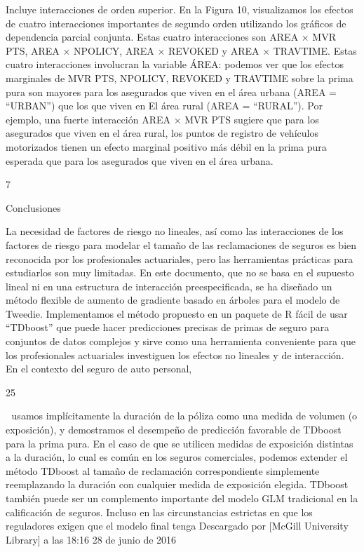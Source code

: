 \documentclass[]{article}
\begin{document}
Incluye interacciones de orden superior. En la Figura 10, visualizamos
los efectos de cuatro interacciones importantes de segundo orden
utilizando los gráficos de dependencia parcial conjunta. Estas cuatro
interacciones son AREA × MVR PTS, AREA × NPOLICY, AREA × REVOKED y AREA
× TRAVTIME. Estas cuatro interacciones involucran la variable ÁREA:
podemos ver que los efectos marginales de MVR PTS, NPOLICY, REVOKED y
TRAVTIME sobre la prima pura son mayores para los asegurados que viven
en el área urbana (AREA = ``URBAN'') que los que viven en El área rural
(AREA = ``RURAL''). Por ejemplo, una fuerte interacción AREA × MVR PTS
sugiere que para los asegurados que viven en el área rural, los puntos
de registro de vehículos motorizados tienen un efecto marginal positivo
más débil en la prima pura esperada que para los asegurados que viven en
el área urbana.

7

Conclusiones

La necesidad de factores de riesgo no lineales, así como las
interacciones de los factores de riesgo para modelar el tamaño de las
reclamaciones de seguros es bien reconocida por los profesionales
actuariales, pero las herramientas prácticas para estudiarlos son muy
limitadas. En este documento, que no se basa en el supuesto lineal ni en
una estructura de interacción preespecificada, se ha diseñado un método
flexible de aumento de gradiente basado en árboles para el modelo de
Tweedie. Implementamos el método propuesto en un paquete de R fácil de
usar ``TDboost'' que puede hacer predicciones precisas de primas de
seguro para conjuntos de datos complejos y sirve como una herramienta
conveniente para que los profesionales actuariales investiguen los
efectos no lineales y de interacción. En el contexto del seguro de auto
personal,

25

 usamos implícitamente la duración de la póliza como una medida de
volumen (o exposición), y demostramos el desempeño de predicción
favorable de TDboost para la prima pura. En el caso de que se utilicen
medidas de exposición distintas a la duración, lo cual es común en los
seguros comerciales, podemos extender el método TDboost al tamaño de
reclamación correspondiente simplemente reemplazando la duración con
cualquier medida de exposición elegida. TDboost también puede ser un
complemento importante del modelo GLM tradicional en la calificación de
seguros. Incluso en las circunstancias estrictas en que los reguladores
exigen que el modelo final tenga Descargado por {[}McGill University
Library{]} a las 18:16 28 de junio de 2016
\end{document}
